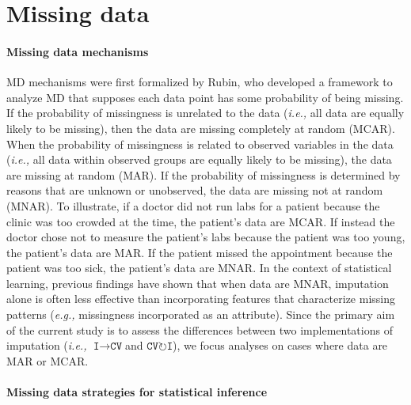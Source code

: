 \documentclass[AMA,STIX1COL,doublespace]{WileyNJD-v2}
\begin{document}
\section{Missing data} \label{sec:missing_data}

\paragraph{Missing data mechanisms}

MD mechanisms were first formalized by Rubin,\citep{rubin1976inference}
who developed a framework to analyze MD that supposes each data point
has some probability of being missing. If the probability of missingness
is unrelated to the data (\textit{i.e., }all data are equally likely to
be missing), then the data are missing completely at random (MCAR). When
the probability of missingness is related to observed variables in the
data (\textit{i.e., }all data within observed groups are equally likely
to be missing), the data are missing at random (MAR). If the probability
of missingness is determined by reasons that are unknown or unobserved,
the data are missing not at random (MNAR). To illustrate, if a doctor
did not run labs for a patient because the clinic was too crowded at the
time, the patient's data are MCAR. If instead the doctor chose not to
measure the patient's labs because the patient was too young, the
patient's data are MAR. If the patient missed the appointment because
the patient was too sick, the patient's data are MNAR. In the context of
statistical learning, previous findings have shown that when data are
MNAR, imputation alone is often less effective than incorporating
features that characterize missing patterns (\textit{e.g., }missingness
incorporated as an
attribute).\citep{twala2008good, twala2009empirical, tang2017random}
Since the primary aim of the current study is to assess the differences
between two implementations of imputation
(\textit{i.e., }$\texttt{I}\!\!\rightarrow\!\texttt{CV}$\space and
$\texttt{CV}\!\circlearrowright\!\texttt{I}$), we focus analyses on
cases where data are MAR or MCAR.

\paragraph{Missing data strategies for statistical inference}
\end{document}
